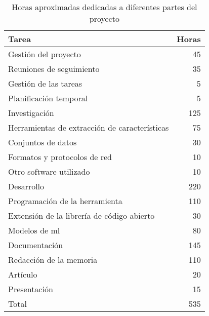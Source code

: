 \begin{table}[H]
  \centering
  \begin{tabular}{|l | r |}
      \hline
      \rowcolor{lightgray} \textbf{Tarea}                & \textbf{Horas}       \\  
      \hline
      \rowcolor{lightgray} Gestión del proyecto     &  45                  \\
      Reuniones de seguimiento                      &  35                  \\
      Gestión de las tareas                         &   5                  \\
      Planificación temporal                        &   5                  \\  
      \hline
      \rowcolor{lightgray} Investigación            & 125                  \\
      Herramientas de extracción de características &  75                  \\
      Conjuntos de datos                            &  30                  \\
      Formatos y protocolos de red                  &  10                  \\
      Otro software utilizado                       &  10                  \\
      \hline
      \rowcolor{lightgray} Desarrollo               & 220                  \\
      Programación de la herramienta                & 110                  \\
      Extensión de la librería de código abierto    &  30                  \\
      Modelos de \acrshort{ml}                      &  80                  \\
      \hline
      \rowcolor{lightgray} Documentación            & 145                  \\
      Redacción de la memoria                       & 110                  \\
      Artículo                                      &  20                  \\
      Presentación                                  &  15                  \\
      \hline
      \rowcolor{lightgray} Total                    & 535                  \\
      \hline
  \end{tabular}
  \caption{Horas aproximadas dedicadas a diferentes partes del proyecto}
  \label{table:horasdedicadas}
\end{table}


